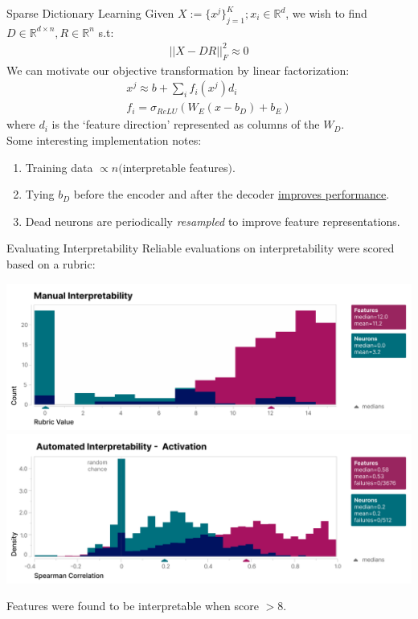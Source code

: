 \documentclass{beamer}
\begin{document}
\begin{frame}{Sparse Dictionary Learning}
	Given $X := \{x^j\}^K_{j=1}; x_i \in \mathbb{R}^d$, we wish to find $D \in \mathbb{R}^{d \times n}, R \in \mathbb{R}^n$ s.t:
	\begin{gather}
		||X-DR||^2_F \approx 0
	\end{gather} \pause
	We can motivate our objective transformation by linear factorization:
	\begin{gather}
		x^j \approx b + \sum_i f_i(x^j)d_i \\
		f_i = \sigma_{ReLU}(W_E(x-b_D)+ b_E)
	\end{gather}
	where $d_i$ is the `feature direction' represented as columns of the $W_D$. \pause \newline \\
	
	Some interesting implementation notes:
	\begin{enumerate}[label=\alph*.]
		\item Training data $\propto n($interpretable features$)$. \pause
		\item Tying $b_D$ before the encoder and after the decoder \underline{improves performance}. \pause
		\item Dead neurons are periodically \textit{resampled} to improve feature representations.
	\end{enumerate}
\end{frame}

\begin{frame}{Evaluating Interpretability}
	Reliable evaluations on interpretability were scored based on a rubric:
	\begin{center}
		\includegraphics[width=.7\textwidth]{img/scores.png}
		\includegraphics[width=.7\textwidth]{img/ascores-activ.png}
	\end{center}
	\vspace{-1em}
	Features were found to be interpretable when score $> 8$.
\end{frame}
\end{document}
